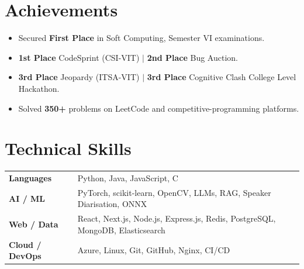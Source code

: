 \documentclass[a4paper,10pt]{article}
\begin{document}
\section{Achievements}
\begin{minipage}[t]{\linewidth}
\begin{itemize}[nosep,after=\strut, leftmargin=2.3em, itemsep=1.2pt,label=\textbullet]
\item Secured \textbf{First Place} in Soft Computing, Semester VI examinations.
\item \textbf{1st Place} CodeSprint (CSI-VIT) $|$ \textbf{2nd Place} Bug Auction.
\item \textbf{3rd Place} Jeopardy (ITSA-VIT) $|$ \textbf{3rd Place} Cognitive Clash College Level Hackathon.
\item Solved \textbf{350+} problems on LeetCode and competitive-programming platforms.
\end{itemize}
\end{minipage}

\section{Technical Skills}
\begin{tabularx}{\linewidth}{@{}l X@{}}
\textbf{Languages} & Python, Java, JavaScript, C \\
\textbf{AI / ML} & PyTorch, scikit-learn, OpenCV, LLMs, RAG, Speaker Diarisation, ONNX \\
\textbf{Web / Data} & React, Next.js, Node.js, Express.js, Redis, PostgreSQL, MongoDB, Elasticsearch \\
\textbf{Cloud / DevOps} & Azure, Linux, Git, GitHub, Nginx, CI/CD \\
\end{tabularx}
\end{document}
